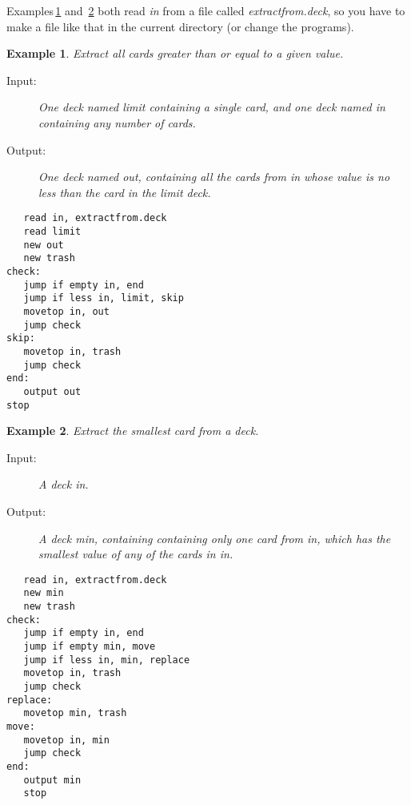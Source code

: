 \documentclass[a4paper,twoside]{tufte-handout}
\newtheorem{example}{Example}
\begin{document}
Examples\,\ref{extractge} and~\ref{extractsmallest} both read \emph{in} from a file called
\emph{extractfrom.deck}, so you have to make a file like that in the
current directory (or change the programs).

\begin{example}\label{extractge}
  Extract all cards greater than or equal to a given value.
  \begin{description}
  \item[Input:] One deck named \emph{limit} containing a single card,
    and one deck named \emph{in} containing any number of cards.
  \item[Output:] One deck named \emph{out}, containing all the cards
    from \emph{in} whose value is no less than the card in the
    \emph{limit} deck.
 \end{description}
\begin{lstlisting}
   read in, extractfrom.deck
   read limit
   new out
   new trash
check:
   jump if empty in, end
   jump if less in, limit, skip
   movetop in, out
   jump check
skip:
   movetop in, trash
   jump check
end:
   output out
stop
\end{lstlisting}
\end{example}

\begin{example}\label{extractsmallest}
  Extract the smallest card from a deck.
  \begin{description}
  \item[Input:] A deck \emph{in}.
  \item[Output:] A deck \emph{min}, containing containing only one
    card from \emph{in}, which has the smallest value of any of the
    cards in \emph{in}.
 \end{description}
\begin{lstlisting}
   read in, extractfrom.deck
   new min
   new trash
check:
   jump if empty in, end
   jump if empty min, move
   jump if less in, min, replace
   movetop in, trash
   jump check
replace:
   movetop min, trash
move:
   movetop in, min
   jump check
end:
   output min
   stop
\end{lstlisting}
\end{example}
\end{document}
